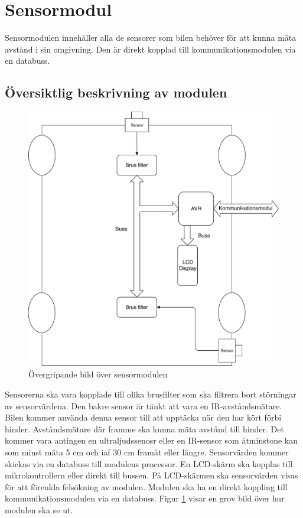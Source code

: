 \documentclass[systemskiss/skiss.tex]{subfiles}
\begin{document}
\section{Sensormodul}
Sensormodulen innehåller alla de sensorer som bilen behöver för att kunna mäta avstånd i sin omgivning. Den är direkt kopplad till kommunikationsmodulen via en databuss.
\subsection{Översiktlig beskrivning av modulen}
\begin{figure}[h]
    \centering
    \includegraphics[width=0.6\linewidth]{systemskiss/figures/sensormodul.pdf}
    \caption{Övergripande bild över sensormodulen}
    \label{fig:sensorskiss}
\end{figure}
\noindent
Sensorerna ska vara kopplade till olika brusfilter som ska filtrera bort
störningar av sensorvärdena. Den bakre sensor är tänkt att vara en
IR-avståndsmätare. Bilen kommer använda denna sensor till att upptäcka när den
har kört förbi hinder. Avståndsmätare där framme ska kunna mäta avstånd till
hinder. Det kommer vara antingen en ultraljudssenosr eller en IR-sensor som
åtminstone kan som minst mäta 5 cm och iaf 30 cm framåt eller längre.
Sensorvärden kommer skickas via en databuss till modulens
processor. En LCD-skärm ska kopplas till mikrokontrollern eller direkt till
bussen. På LCD-skärmen ska sensorvärden visas för att förenkla felsökning av modulen. Modulen ska ha en direkt koppling till kommunikationsmodulen via en databuss. Figur \ref{fig:sensorskiss} visar en grov bild över hur modulen ska se ut.
\end{document}
